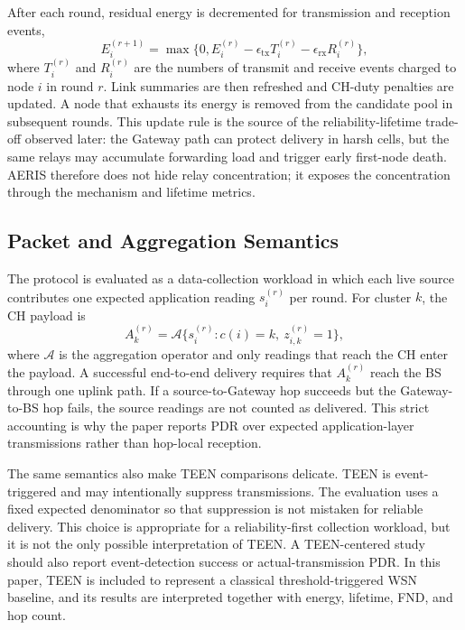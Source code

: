 \documentclass[conference]{IEEEtran}
\begin{document}
After each round, residual energy is decremented for transmission and reception events,
\begin{equation}
E_i^{(r+1)}=\max\{0,E_i^{(r)}-\epsilon_{\mathrm{tx}}T_i^{(r)}-\epsilon_{\mathrm{rx}}R_i^{(r)}\},
\end{equation}
where $T_i^{(r)}$ and $R_i^{(r)}$ are the numbers of transmit and receive events charged to node $i$ in round $r$. Link summaries are then refreshed and CH-duty penalties are updated. A node that exhausts its energy is removed from the candidate pool in subsequent rounds. This update rule is the source of the reliability-lifetime trade-off observed later: the Gateway path can protect delivery in harsh cells, but the same relays may accumulate forwarding load and trigger early first-node death. AERIS therefore does not hide relay concentration; it exposes the concentration through the mechanism and lifetime metrics.

\subsection{Packet and Aggregation Semantics}
The protocol is evaluated as a data-collection workload in which each live source contributes one expected application reading $s_i^{(r)}$ per round. For cluster $k$, the CH payload is
\begin{equation}
A_k^{(r)}=\mathcal{A}\{s_i^{(r)}:c(i)=k,\ z_{i,k}^{(r)}=1\},
\end{equation}
where $\mathcal{A}$ is the aggregation operator and only readings that reach the CH enter the payload. A successful end-to-end delivery requires that $A_k^{(r)}$ reach the BS through one uplink path. If a source-to-Gateway hop succeeds but the Gateway-to-BS hop fails, the source readings are not counted as delivered. This strict accounting is why the paper reports PDR over expected application-layer transmissions rather than hop-local reception.

The same semantics also make TEEN comparisons delicate. TEEN is event-triggered and may intentionally suppress transmissions. The evaluation uses a fixed expected denominator so that suppression is not mistaken for reliable delivery. This choice is appropriate for a reliability-first collection workload, but it is not the only possible interpretation of TEEN. A TEEN-centered study should also report event-detection success or actual-transmission PDR. In this paper, TEEN is included to represent a classical threshold-triggered WSN baseline, and its results are interpreted together with energy, lifetime, FND, and hop count.
\end{document}
